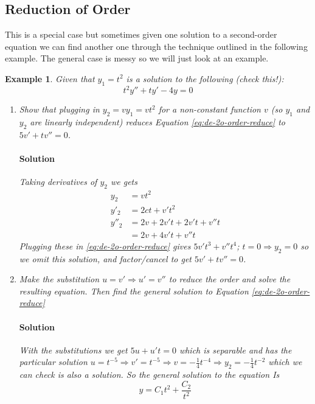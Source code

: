 \documentclass[letterpaper, 11pt, openany]{book}
\theoremstyle{mytheoremstyle}
\theoremstyle{myexamplestyle}
\newtheorem{example}{Example}[section]
\newenvironment{solution}{\paragraph{\sffamily \smaller \fontseries{b}\selectfont Solution}}{\hfill\faSquare}
\begin{document}
\subsection{Reduction of Order}

This is a special case but sometimes given one solution to a second-order equation we can find another one through the technique outlined in the following example. The general case is messy so we will just look at an example.

\begin{example}\label{e:de-2o-order-reduce}
    Given that \(y_{1} = t^{2}\) is a solution to the following (check this!):
    \begin{equation}\label{eq:de-2o-order-reduce}
        t^{2} y'' + ty' - 4y = 0
    \end{equation}

    \begin{enumerate}
        \item Show that plugging in \(y_{2} = v y_{1} = v t^{2}\) for a non-constant function \(v\) (so \(y_{1}\) and \(y_{2}\) are linearly independent) reduces Equation \eqref{eq:de-2o-order-reduce} to \(5v' + tv'' = 0\).
        \begin{solution}
            Taking derivatives of \(y_{2}\) we gets
            \begin{align*}
                y_{2} &= vt^{2}\\
                y'_{2} &= 2ct + v't^{2}\\
                y''_{2} &= 2v + 2v't + 2v't + v''t\\
                        &= 2v + 4v't + v''t
            \end{align*}
            Plugging these in \eqref{eq:de-2o-order-reduce} gives \(5v't^{3} + v''t^{4}\); \(t=0 \Rightarrow y_{2} = 0\) so we omit this solution, and factor/cancel to get \(5v' + tv'' = 0\).
        \end{solution}
        \item Make the substitution \(u = v' \Rightarrow u' = v''\) to reduce the order and solve the resulting equation. Then find the general solution to Equation \eqref{eq:de-2o-order-reduce}
        \begin{solution}
            With the substitutions we get \(5u + u't = 0\) which is separable and has the particular solution \(u = t^{-5} \Rightarrow v' = t^{-5} \Rightarrow v = -\frac{1}{4} t^{-4} \Rightarrow y_{2} = -\frac{1}{4}t^{-2}\) which we can check is also a solution. \faSmile \; So the general solution to the equation Is
            \[y = C_{1} t^{2} + \frac{C_{2}}{t^{2}}\]
        \end{solution}
    \end{enumerate}
\end{example}
\end{document}
